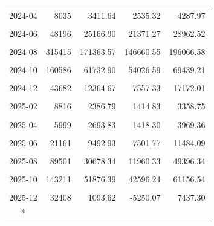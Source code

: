 \begin{longtable}[t]{crrrr}
\cellcolor{gray!10}{2024-03} & \cellcolor{gray!10}{16306} & \cellcolor{gray!10}{11957.50} & \cellcolor{gray!10}{9502.00} & \cellcolor{gray!10}{14413.01}\\
2024-04 & 8035 & 3411.64 & 2535.32 & 4287.97\\
\cellcolor{gray!10}{2024-05} & \cellcolor{gray!10}{19669} & \cellcolor{gray!10}{9263.83} & \cellcolor{gray!10}{8300.83} & \cellcolor{gray!10}{10226.83}\\
2024-06 & 48196 & 25166.90 & 21371.27 & 28962.52\\
\cellcolor{gray!10}{2024-07} & \cellcolor{gray!10}{35755} & \cellcolor{gray!10}{16119.08} & \cellcolor{gray!10}{14425.56} & \cellcolor{gray!10}{17812.60}\\
2024-08 & 315415 & 171363.57 & 146660.55 & 196066.58\\
\cellcolor{gray!10}{2024-09} & \cellcolor{gray!10}{342525} & \cellcolor{gray!10}{188964.45} & \cellcolor{gray!10}{164564.69} & \cellcolor{gray!10}{213364.21}\\
2024-10 & 160586 & 61732.90 & 54026.59 & 69439.21\\
\cellcolor{gray!10}{2024-11} & \cellcolor{gray!10}{75577} & \cellcolor{gray!10}{23151.37} & \cellcolor{gray!10}{16735.83} & \cellcolor{gray!10}{29566.90}\\
2024-12 & 43682 & 12364.67 & 7557.33 & 17172.01\\
\cellcolor{gray!10}{2025-01} & \cellcolor{gray!10}{13615} & \cellcolor{gray!10}{3217.93} & \cellcolor{gray!10}{1097.28} & \cellcolor{gray!10}{5338.58}\\
2025-02 & 8816 & 2386.79 & 1414.83 & 3358.75\\
\cellcolor{gray!10}{2025-03} & \cellcolor{gray!10}{10144} & \cellcolor{gray!10}{4641.01} & \cellcolor{gray!10}{2862.31} & \cellcolor{gray!10}{6419.71}\\
2025-04 & 5999 & 2693.83 & 1418.30 & 3969.36\\
\cellcolor{gray!10}{2025-05} & \cellcolor{gray!10}{16707} & \cellcolor{gray!10}{7751.45} & \cellcolor{gray!10}{6964.18} & \cellcolor{gray!10}{8538.72}\\
2025-06 & 21161 & 9492.93 & 7501.77 & 11484.09\\
\cellcolor{gray!10}{2025-07} & \cellcolor{gray!10}{34989} & \cellcolor{gray!10}{15908.06} & \cellcolor{gray!10}{14174.64} & \cellcolor{gray!10}{17641.48}\\
2025-08 & 89501 & 30678.34 & 11960.33 & 49396.34\\
\cellcolor{gray!10}{2025-09} & \cellcolor{gray!10}{147493} & \cellcolor{gray!10}{35795.41} & \cellcolor{gray!10}{973.82} & \cellcolor{gray!10}{70617.01}\\
2025-10 & 143211 & 51876.39 & 42596.24 & 61156.54\\
\cellcolor{gray!10}{2025-11} & \cellcolor{gray!10}{65739} & \cellcolor{gray!10}{16321.25} & \cellcolor{gray!10}{8691.59} & \cellcolor{gray!10}{23950.92}\\
2025-12 & 32408 & 1093.62 & -5250.07 & 7437.30\\*
\end{longtable}
